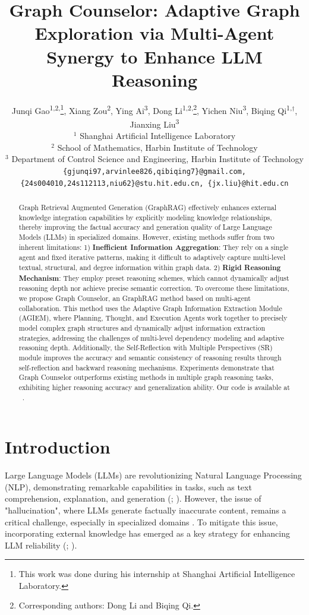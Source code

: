 \documentclass[11pt]{article}
\title{Graph Counselor: Adaptive Graph Exploration via Multi-Agent Synergy to Enhance LLM Reasoning}
\author{
  Junqi Gao\textsuperscript{1,2,}\thanks{This work was done during his internship at Shanghai Artificial Intelligence Laboratory.},
  Xiang Zou\textsuperscript{2},
  Ying Ai\textsuperscript{3},
  Dong Li\textsuperscript{1,2,}\thanks{Corresponding authors: Dong Li and Biqing Qi.},
  Yichen Niu\textsuperscript{3},
  Biqing Qi\textsuperscript{1,}$^\dag$, 
  Jianxing Liu\textsuperscript{3} \\
  $^1$ Shanghai Artificial Intelligence Laboratory \\
  $^2$ School of Mathematics, Harbin Institute of Technology \\
  $^3$ Department of Control Science and Engineering, Harbin Institute of Technology \\
  {\tt\small \{gjunqi97,arvinlee826,qibiqing7\}@gmail.com,} \\ 
  {\tt\small \{24s004010,24s112113,niu62\}@stu.hit.edu.cn, \{jx.liu\}@hit.edu.cn}
  }
\begin{document}
\maketitle
\begin{abstract}

Graph Retrieval Augmented Generation (GraphRAG) effectively enhances external knowledge integration capabilities by explicitly modeling knowledge relationships, thereby improving the factual accuracy and generation quality of Large Language Models (LLMs) in specialized domains. However, existing methods suffer from two inherent limitations: 1) \textbf{Inefficient Information Aggregation}: They rely on a single agent and fixed iterative patterns, making it difficult to adaptively capture multi-level textual, structural, and degree information within graph data. 2) \textbf{Rigid Reasoning Mechanism}: They employ preset reasoning schemes, which cannot dynamically adjust reasoning depth nor achieve precise semantic correction. To overcome these limitations, we propose Graph Counselor, an GraphRAG method based on multi-agent collaboration. This method uses the Adaptive Graph Information Extraction Module (AGIEM), where Planning, Thought, and Execution Agents work together to precisely model complex graph structures and dynamically adjust information extraction strategies, addressing the challenges of multi-level dependency modeling and adaptive reasoning depth. Additionally, the Self-Reflection with Multiple Perspectives (SR) module improves the accuracy and semantic consistency of reasoning results through self-reflection and backward reasoning mechanisms. Experiments demonstrate that Graph Counselor outperforms existing methods in multiple graph reasoning tasks, exhibiting higher reasoning accuracy and generalization ability.
Our code is available at \faGithub~\href{https://github.com/gjq100/Graph-Counselor.git}{\color{blue!50}{Graph-Counselor}}.
\end{abstract}


\section{Introduction}
Large Language Models (LLMs) are revolutionizing Natural Language Processing (NLP), demonstrating remarkable capabilities in tasks, such as text comprehension, explanation, and generation (\citealp{schaeffer2023are}; \citealp{qi2023large}). However, the issue of "hallucination", where LLMs generate factually inaccurate content, remains a critical challenge, especially in specialized domains \citep{rawte2023survey}. To mitigate this issue, incorporating external knowledge has emerged as a key strategy for enhancing LLM reliability (\citealp{gao2023retrieval}; \citealp{qi2024interactive}).
\end{document}
